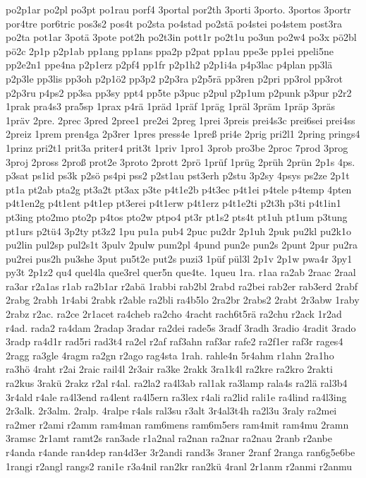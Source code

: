 {po2p1ar
po2pl
po3pt
po1rau
porf4
3portal
por2th
3porti
3porto.
3portos
3portr
por4tre
por6tric
pos3s2
pos4t
po2sta
po4stad
po2stä
po4stei
po4stem
post3ra
po2ta
pot1ar
3potä
3pote
pot2h
po2t3in
pott1r
po2t1u
po3un
po2w4
po3x
pö2bl
pö2c
2p1p
p2p1ab
pp1ang
pp1ans
ppa2p
p2pat
pp1au
ppe3e
pp1ei
ppeli5ne
pp2e2n1
ppe4na
p2p1erz
p2pf4
pp1fr
p2p1h2
p2p1i4a
p4p3lac
p4plan
pp3lä
p2p3le
pp3lis
pp3oh
p2p1ö2
pp3p2
p2p3ra
p2p5rä
pp3ren
p2pri
pp3rol
pp3rot
p2p3ru
p4ps2
pp3sa
pp3sy
ppt4
pp5te
p3puc
p2pul
p2p1um
p2punk
p3pur
p2r2
1prak
pra4s3
pra5sp
1prax
p4rä
1präd
1präf
1präg
1präl
3präm
1präp
3präs
1präv
2pre.
2prec
3pred
2pree1
pre2ei
2preg
1prei
3preis
prei4s3c
prei6sei
prei4ss
2preiz
1prem
pren4ga
2p3rer
1pres
press4e
1preß
pri4e
2prig
pri2l1
2pring
prings4
1prinz
pri2t1
prit3a
priter4
prit3t
1priv
1pro1
3prob
pro3be
2proc
7prod
3prog
3proj
2pross
2proß
prot2e
3proto
2prott
2prö
1prüf
1prüg
2prüh
2prün
2p1s
4ps.
p3sat
ps1id
ps3k
p2sö
ps4pi
pss2
p2st1au
pst3erh
p2stu
3p2sy
4psys
ps2ze
2p1t
pt1a
pt2ab
pta2g
pt3a2t
pt3ax
p3te
p4t1e2b
p4t3ec
p4t1ei
p4tele
p4temp
4pten
p4t1en2g
p4t1ent
p4t1ep
pt3erei
p4t1erw
p4t1erz
p4t1e2ti
p2t3h
p3ti
p4t1in1
pt3ing
pto2mo
pto2p
p4tos
pto2w
ptpo4
pt3r
pt1s2
pts4t
pt1uh
pt1um
p3tung
pt1urs
p2tü4
3p2ty
pt3z2
1pu
pu1a
pub4
2puc
pu2dr
2p1uh
2puk
pu2kl
pu2k1o
pu2lin
pul2sp
pul2s1t
3pulv
2pulw
pum2pl
4pund
pun2e
pun2s
2punt
2pur
pu2ra
pu2rei
pus2h
pu3she
3put
pu5t2e
put2s
puzi3
1püf
pül3l
2p1v
2p1w
pwa4r
3py1
py3t
2p1z2
qu4
quel4la
que3rel
quer5n
que4te.
1queu
1ra.
r1aa
ra2ab
2raac
2raal
ra3ar
r2a1as
r1ab
ra2b1ar
r2abä
1rabbi
rab2bl
2rabd
ra2bei
rab2er
rab3erd
2rabf
2rabg
2rabh
1r4abi
2rabk
r2able
ra2bli
ra4b5lo
2ra2br
2rabs2
2rabt
2r3abw
1raby
2rabz
r2ac.
ra2ce
2r1acet
ra4cheb
ra2cho
4racht
rach6t5rä
ra2chu
r2ack
1r2ad
r4ad.
rada2
ra4dam
2radap
3radar
ra2dei
rade5s
3radf
3radh
3radio
4radit
3rado
3radp
ra4d1r
rad5ri
rad3t4
ra2el
r2af
raf3ahn
raf3ar
rafe2
ra2f1er
raf3r
rages4
2ragg
ra3gle
4ragm
ra2gn
r2ago
rag4sta
1rah.
rahle4n
5r4ahm
r1ahn
2ra1ho
ra3hö
4raht
r2ai
2raic
rail4l
2r3air
ra3ke
2rakk
3ra1k4l
ra2kre
ra2kro
2rakti
ra2kus
3rakü
2rakz
r2al
r4al.
ra2la2
ra4l3ab
ral1ak
ra3lamp
rala4s
ra2lä
ral3b4
3r4ald
r4ale
ra4l3end
ra4lent
ra4l5ern
ra3lex
r4ali
ra2lid
rali1e
ra4lind
ra4l3ing
2r3alk.
2r3alm.
2ralp.
4ralpe
r4als
ral3su
r3alt
3r4al3t4h
ra2l3u
3raly
ra2mei
ra2mer
r2ami
r2amm
ram4man
ram6mens
ram6m5ers
ram4mit
ram4mu
2ramn
3ramsc
2r1amt
ramt2s
ran3ade
r1a2nal
ra2nan
ra2nar
ra2nau
2ranb
r2anbe
r4anda
r4ande
ran4dep
ran4d3er
3r2andi
rand3s
3raner
2ranf
2ranga
ran6g5e6be
1rangi
r2angl
rangs2
rani1e
r3a4nil
ran2kr
ran2kü
4ranl
2r1anm
r2anmi
r2anmu
}
